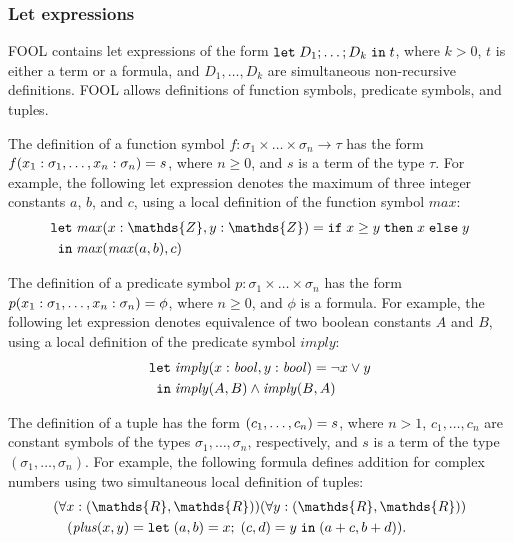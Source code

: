 \documentclass{easychair}
\begin{document}
\subsubsection{Let expressions}
FOOL contains let expressions of the form $\mathtt{let}\;{D_1;\ldots;D_k}\;\allowbreak\mathtt{in}\;{t}$, where
$k > 0$, $t$ is either a term or a formula, and $D_1,\ldots,D_k$ are
simultaneous non-recursive definitions. FOOL allows definitions of function
symbols, predicate symbols, and tuples.

The definition of a function symbol 
$f:\sigma_1\times\ldots\times\sigma_n\to\tau$ has the form 
${f(x_1:\sigma_1,\ldots,x_n:\sigma_n)}={s}$, where
$n \geq 0$, and $s$ is a term of the type $\tau$.
For example, the following let expression denotes the maximum of three 
integer constants $a$, $b$, and $c$, using a local definition of the function 
symbol $\mathit{max}$:
\begin{equation}\label{eq:fool-let-imply}
\begin{aligned}
\mathtt{let}\;&\binding{\mathit{max}(x:\mathds{Z},y:\mathds{Z})}
                       {\ite{x \geq y}{x}{y}}\\
 \mathtt{in}\;&\mathit{max}(\mathit{max}(a,b),c)
\end{aligned}
\end{equation}

The definition of a predicate symbol $p:\sigma_1\times\ldots\times\sigma_n$ has 
the form ${p(x_1:\sigma_1,\ldots,x_n:\sigma_n)}={\phi}$, where 
$n \geq 0$, and $\phi$ is a formula.
For example, the following let expression denotes equivalence of two boolean 
constants $A$ and $B$, using a local definition of the predicate symbol 
$\mathit{imply}$:
\begin{equation}\label{eq:fool-let-imply2}
\begin{aligned}
\mathtt{let}\;&{\mathit{imply}(x:\mathit{bool},y:\mathit{bool})}={\neg x \lor y}\\
 \mathtt{in}\;&\mathit{imply}(A,B)\wedge\mathit{imply}(B,A)
\end{aligned}
\end{equation}

The definition of a tuple has the form ${(c_1,\ldots,c_n)}={s}$, where
$n > 1$, $c_1,\ldots,c_n$ are constant symbols of the types
$\sigma_1,\ldots,\sigma_n$, respectively, and $s$ is a term of the type
$(\sigma_1,\ldots,\sigma_n)$. 
For example, the following formula defines addition for complex numbers using 
two simultaneous local definition of tuples:
\begin{equation}\label{eq:fool-tuple-let}
  \begin{aligned}
  &(\forall x:(\mathds{R},\mathds{R}))(\forall y:(\mathds{R},\mathds{R}))\\
  &\quad(\mathit{plus}(x,y) = \letinpar{(a,b)}{x}{(c,d)}{y}{\tuple{a+c,b+d}).}
  \end{aligned}
\end{equation}
\end{document}
